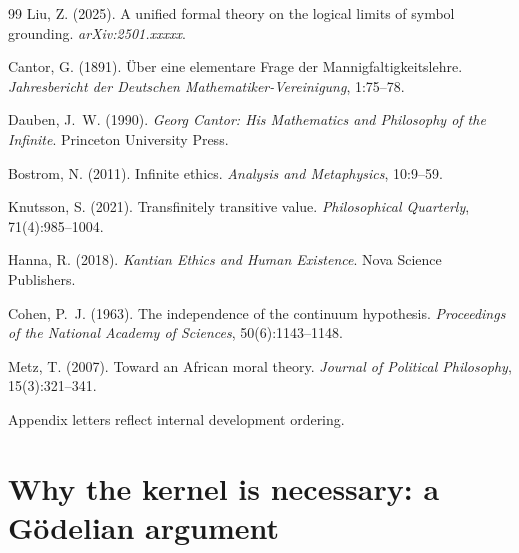 \documentclass[11pt]{article}
\begin{document}
\begin{thebibliography}{99}
Liu, Z. (2025). A unified formal theory on the logical limits of symbol grounding. \textit{arXiv:2501.xxxxx}.

Cantor, G. (1891). {\"U}ber eine elementare {F}rage der {M}annigfaltigkeitslehre. \textit{Jahresbericht der Deutschen Mathematiker-Vereinigung}, 1:75--78.

Dauben, J.~W. (1990). \textit{Georg Cantor: His Mathematics and Philosophy of the Infinite}. Princeton University Press.

Bostrom, N. (2011). Infinite ethics. \textit{Analysis and Metaphysics}, 10:9--59.

Knutsson, S. (2021). Transfinitely transitive value. \textit{Philosophical Quarterly}, 71(4):985--1004.

Hanna, R. (2018). \textit{Kantian Ethics and Human Existence}. Nova Science Publishers.

Cohen, P.~J. (1963). The independence of the continuum hypothesis. \textit{Proceedings of the National Academy of Sciences}, 50(6):1143--1148.

Metz, T. (2007). Toward an {A}frican moral theory. \textit{Journal of Political Philosophy}, 15(3):321--341.

\end{thebibliography}


\newpage
\appendix

Appendix letters reflect internal development ordering.

\section{Why the kernel is necessary: a G\"{o}delian argument}
\label{app:godel}
\end{document}
